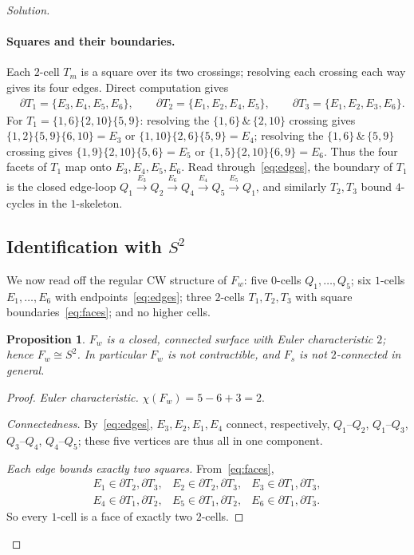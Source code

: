 \documentclass{amsart}
\newtheorem{proposition}{Proposition}
\theoremstyle{definition}
\newcommand{\bdy}{\partial}
\begin{document}
\begin{proof}[Solution]
\paragraph{Squares and their boundaries.}
Each $2$-cell $T_m$ is a square over its two crossings; resolving each crossing each way gives
its four edges. Direct computation gives
\begin{equation}\label{eq:faces}
\begin{aligned}
&\bdy T_1 = \{E_3,E_4,E_5,E_6\},\qquad
 \bdy T_2 = \{E_1,E_2,E_4,E_5\},\qquad
 \bdy T_3 = \{E_1,E_2,E_3,E_6\}.
\end{aligned}
\end{equation}
For $T_1=\{1,6\}\{2,10\}\{5,9\}$: resolving the $\{1,6\}\,\&\,\{2,10\}$ crossing gives
$\{1,2\}\{5,9\}\{6,10\}=E_3$ or $\{1,10\}\{2,6\}\{5,9\}=E_4$; resolving the
$\{1,6\}\,\&\,\{5,9\}$ crossing gives $\{1,9\}\{2,10\}\{5,6\}=E_5$ or
$\{1,5\}\{2,10\}\{6,9\}=E_6$. Thus the four facets of $T_1$ map onto $E_3,E_4,E_5,E_6$. Read
through~\eqref{eq:edges}, the boundary of $T_1$ is the closed edge-loop
$Q_1\xrightarrow{E_3}Q_2\xrightarrow{E_6}Q_4\xrightarrow{E_4}Q_5\xrightarrow{E_5}Q_1$, and
similarly $T_2,T_3$ bound $4$-cycles in the $1$-skeleton.

\subsection{Identification with \texorpdfstring{$S^2$}{S2}}\label{sec:sphere}

We now read off the regular CW structure of $F_w$: five $0$-cells $Q_1,\dots,Q_5$; six
$1$-cells $E_1,\dots,E_6$ with endpoints~\eqref{eq:edges}; three $2$-cells $T_1,T_2,T_3$ with
square boundaries~\eqref{eq:faces}; and no higher cells.

\begin{proposition}\label{prop:s2}
$F_w$ is a closed, connected surface with Euler characteristic $2$; hence $F_w\cong S^2$. In
particular $F_w$ is not contractible, and $F_s$ is not $2$-connected in general.
\end{proposition}

\begin{proof}
\emph{Euler characteristic.} $\chi(F_w)=5-6+3=2$.

\emph{Connectedness.} By~\eqref{eq:edges}, $E_3,E_2,E_1,E_4$ connect, respectively, $Q_1$--$Q_2$,
$Q_1$--$Q_3$, $Q_3$--$Q_4$, $Q_4$--$Q_5$; these five vertices are thus all in one component.

\emph{Each edge bounds exactly two squares.} From~\eqref{eq:faces},
\[
\begin{array}{lll}
E_1\in\bdy T_2,\bdy T_3, & E_2\in\bdy T_2,\bdy T_3, & E_3\in\bdy T_1,\bdy T_3,\\
E_4\in\bdy T_1,\bdy T_2, & E_5\in\bdy T_1,\bdy T_2, & E_6\in\bdy T_1,\bdy T_3.
\end{array}
\]
So every $1$-cell is a face of exactly two $2$-cells.


\end{proof}
\end{proof}
\end{document}

